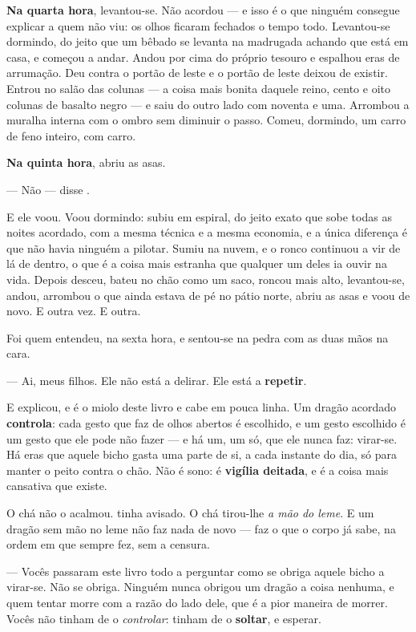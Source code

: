 \documentclass[livro.tex]{subfiles}
\begin{document}
\textbf{Na quarta hora}, levantou-se. Não acordou --- e isso é o que ninguém consegue explicar a
quem não viu: os olhos ficaram fechados o tempo todo. Levantou-se dormindo, do jeito que um bêbado
se levanta na madrugada achando que está em casa, e começou a andar. Andou por cima do próprio
tesouro e espalhou eras de arrumação. Deu contra o portão de leste e o portão de leste deixou de
existir. Entrou no salão das colunas --- a coisa mais bonita daquele reino, cento e oito colunas
de basalto negro --- e saiu do outro lado com noventa e uma. Arrombou a muralha interna com o
ombro sem diminuir o passo. Comeu, dormindo, um carro de feno inteiro, com carro.

\textbf{Na quinta hora}, abriu as asas.

--- Não --- disse \Qui .

E ele voou. Voou dormindo: subiu em espiral, do jeito exato que sobe todas as noites acordado,
com a mesma técnica e a mesma economia, e a única diferença é que não havia ninguém a pilotar.
Sumiu na nuvem, e o ronco continuou a vir de lá de dentro, o que é a coisa mais estranha que
qualquer um deles ia ouvir na vida. Depois desceu, bateu no chão como um saco, roncou mais alto,
levantou-se, andou, arrombou o que ainda estava de pé no pátio norte, abriu as asas e voou de
novo. E outra vez. E outra.

\medskip

Foi \Qui quem entendeu, na sexta hora, e sentou-se na pedra com as duas mãos na cara.

--- Ai, meus filhos. Ele não está a delirar. Ele está a \textbf{repetir}.

E explicou, e é o miolo deste livro e cabe em pouca linha. Um dragão acordado \textbf{controla}:
cada gesto que \Ven faz de olhos abertos é escolhido, e um gesto escolhido é um gesto que ele
pode não fazer --- e há um, um só, que ele nunca faz: virar-se. Há eras que aquele bicho gasta
uma parte de si, a cada instante do dia, só para manter o peito contra o chão. Não é sono: é
\textbf{vigília deitada}, e é a coisa mais cansativa que existe.

O chá não o acalmou. \Qui tinha avisado. O chá tirou-lhe \emph{a mão do leme}. E um dragão sem
mão no leme não faz nada de novo --- faz o que o corpo já sabe, na ordem em que sempre fez, sem a
censura.

--- Vocês passaram este livro todo a perguntar como se obriga aquele bicho a virar-se. Não se
obriga. Ninguém nunca obrigou um dragão a coisa nenhuma, e quem tentar morre com a razão do lado
dele, que é a pior maneira de morrer. Vocês não tinham de o \emph{controlar}: tinham de o
\textbf{soltar}, e esperar.
\end{document}
